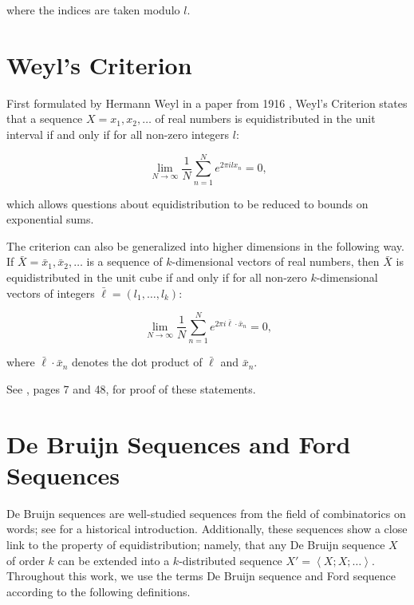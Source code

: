 \documentclass[11pt,a4paper]{tesis}
\theoremstyle{plain}
\theoremstyle{definition}
\begin{document}
where the indices are taken modulo $l$.

\section{Weyl's Criterion}\label{section:weyls-criterion}

First formulated by Hermann Weyl in a paper from 1916 \cite{weyl-1916}, Weyl's Criterion states that a sequence $X = x_1, x_2, \dots$ of real numbers is equidistributed in the unit interval if and only if for all non-zero integers $l$:

\begin{equation*}
  \lim_{N \to \infty} \frac{1}{N} \sum_{n = 1}^{N} e^{2 \pi i l x_n} = 0 \text{,}
\end{equation*}

which allows questions about equidistribution to be reduced to bounds on exponential sums.

The criterion can also be generalized into higher dimensions in the following way. If $\bar{X} = \bar{x}_1, \bar{x}_2, \dots$ is a sequence of $k$-dimensional vectors of real numbers, then $\bar{X}$ is equidistributed in the unit cube if and only if for all non-zero $k$-dimensional vectors of integers $\bar{\ell} = (l_1, \dots, l_k)$:

\begin{equation*}
  \lim_{N \to \infty} \frac{1}{N} \sum_{n = 1}^{N} e^{2 \pi i \bar{\ell} \cdot \bar{x}_n} = 0 \text{,}
\end{equation*}

where $\bar{\ell} \cdot \bar{x}_n$ denotes the dot product of $\bar{\ell}$ and $\bar{x}_n$.

See \cite{tijdeman-1975}, pages 7 and 48, for proof of these statements.

\section{De Bruijn Sequences and Ford Sequences}

De Bruijn sequences are well-studied sequences from the field of combinatorics on words; see \cite{berstel-2007} for a historical introduction. Additionally, these sequences show a close link to the property of equidistribution; namely, that any De Bruijn sequence $X$ of order $k$ can be extended into a $k$-distributed sequence $X' = \left< X ; X ; \dots \right>$. Throughout this work, we use the terms De Bruijn sequence and Ford sequence according to the following definitions.
\end{document}
